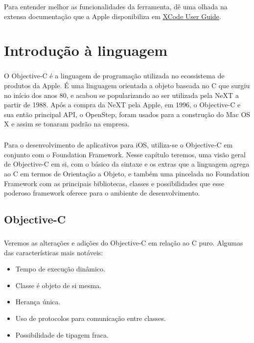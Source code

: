 \documentclass[a4paper,12pt,brazil,doubleside]{book}
\begin{document}
\paragraph{}Para entender melhor as funcionalidades da ferramenta, dê uma olhada na extensa documentação que a Apple disponibiliza em 
\href{https://developer.apple.com/library/ios/#documentation/ToolsLanguages/Conceptual/Xcode_User_Guide}{XCode User Guide}.



\chapter{Introdução à linguagem}

\paragraph{}O Objective-C é a linguagem de programação utilizada no ecossistema de produtos da Apple. É uma linguagem orientada a objeto baseada no C que surgiu no início dos anos 80, e acabou se popularizando ao ser utilizada pela NeXT a partir de 1988. Após a compra da NeXT pela Apple, em 1996, o Objective-C e sua então principal API, o OpenStep, foram usados para a construção do Mac OS X e assim se tonaram padrão na empresa.
\paragraph{}Para o desenvolvimento de aplicativos para iOS, utiliza-se o Objective-C em conjunto com o Foundation Framework. Nesse capítulo teremos, uma visão geral de Objective-C em si, com o básico da sintaxe e os extras que a linguagem agrega ao C em termos de Orientação a Objeto, e também uma pincelada no Foundation Framework com as principais bibliotecas, classes e possibilidades que esse poderoso framework oferece para o ambiente de desenvolvimento.

\bigskip 
\bigskip


\section{Objective-C}

\paragraph{}Veremos as alterações e adições do Objective-C em relação ao C puro. Algumas das características mais notáveis:

\begin{itemize}
\item Tempo de execução dinâmico.
\item Classe é objeto de si mesma.
\item Herança única.
\item Uso de protocolos para comunicação entre classes.
\item Possibilidade de tipagem fraca.
\end{itemize}
\end{document}
